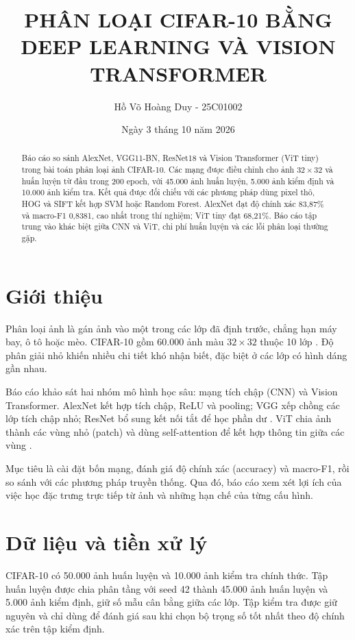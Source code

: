 \documentclass[10pt,a4paper]{article}
\title{PHÂN LOẠI CIFAR-10 BẰNG DEEP LEARNING VÀ VISION TRANSFORMER}
\author{Hồ Võ Hoàng Duy - 25C01002}
\date{Ngày 3 tháng 10 năm 2026}
\begin{document}
\maketitle

\begin{abstract}
Báo cáo so sánh AlexNet, VGG11-BN, ResNet18 và Vision Transformer (ViT tiny)
trong bài toán phân loại ảnh CIFAR-10. Các mạng được điều chỉnh cho ảnh
$32\times32$ và huấn luyện từ đầu trong 200 epoch, với 45.000 ảnh huấn luyện,
5.000 ảnh kiểm định và 10.000 ảnh kiểm tra. Kết quả được đối chiếu với các
phương pháp dùng pixel thô, HOG và SIFT kết hợp SVM hoặc Random Forest.
AlexNet đạt độ chính xác 83,87\% và macro-F1 0,8381, cao nhất trong thí nghiệm;
ViT tiny đạt 68,21\%. Báo cáo tập trung vào khác biệt giữa CNN và ViT,
chi phí huấn luyện và các lỗi phân loại thường gặp.
\end{abstract}

\section{Giới thiệu}
Phân loại ảnh là gán ảnh vào một trong các lớp đã định trước, chẳng hạn
máy bay, ô tô hoặc mèo. CIFAR-10 gồm 60.000 ảnh màu $32\times32$ thuộc 10 lớp
\cite{krizhevsky2009cifar}. Độ phân giải nhỏ khiến nhiều chi tiết khó nhận
biết, đặc biệt ở các lớp có hình dáng gần nhau.

Báo cáo khảo sát hai nhóm mô hình học sâu: mạng tích chập (CNN) và Vision Transformer.
AlexNet kết hợp tích chập, ReLU và pooling; VGG xếp chồng các lớp tích chập nhỏ;
ResNet bổ sung kết nối tắt để học phần dư
\cite{krizhevsky2012alexnet,simonyan2015vgg,he2016resnet}.
ViT chia ảnh thành các vùng nhỏ (patch) và dùng self-attention để kết hợp
thông tin giữa các vùng \cite{dosovitskiy2021vit}.

Mục tiêu là cài đặt bốn mạng, đánh giá độ chính xác (accuracy) và macro-F1,
rồi so sánh với các phương pháp truyền thống. Qua đó, báo cáo xem xét lợi ích
của việc học đặc trưng trực tiếp từ ảnh và những hạn chế của từng cấu hình.

\section{Dữ liệu và tiền xử lý}
CIFAR-10 có 50.000 ảnh huấn luyện và 10.000 ảnh kiểm tra chính thức.
Tập huấn luyện được chia phân tầng với seed 42 thành 45.000 ảnh huấn luyện
và 5.000 ảnh kiểm định, giữ số mẫu cân bằng giữa các lớp. Tập kiểm tra được
giữ nguyên và chỉ dùng để đánh giá sau khi chọn bộ trọng số tốt nhất theo
độ chính xác trên tập kiểm định.
\end{document}
